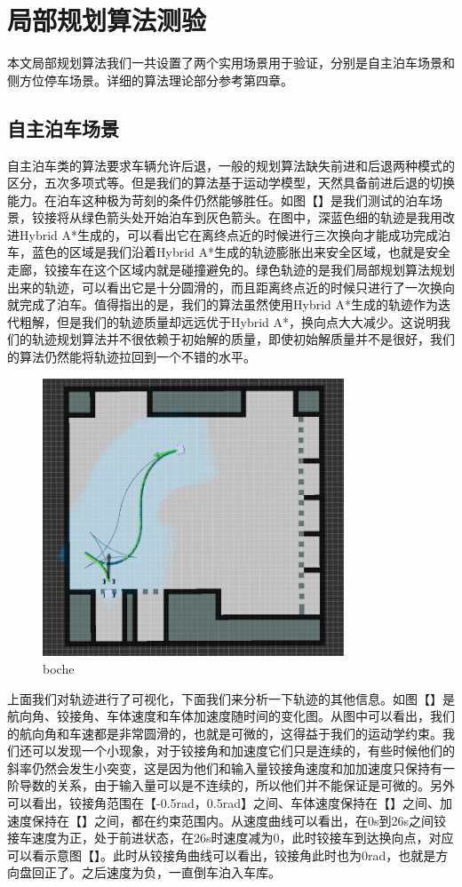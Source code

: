 \documentclass[master,academic]{ysuthesis} %
\begin{document}
	\section{局部规划算法测验}
	本文局部规划算法我们一共设置了两个实用场景用于验证，分别是自主泊车场景和侧方位停车场景。详细的算法理论部分参考第四章。
		\subsection{自主泊车场景}
		自主泊车类的算法要求车辆允许后退，一般的规划算法缺失前进和后退两种模式的区分，五次多项式等。但是我们的算法基于运动学模型，天然具备前进后退的切换能力。在泊车这种极为苛刻的条件仍然能够胜任。如图【】是我们测试的泊车场景，铰接将从绿色箭头处开始泊车到灰色箭头。在图中，深蓝色细的轨迹是我用改进Hybrid A*生成的，可以看出它在离终点近的时候进行三次换向才能成功完成泊车，蓝色的区域是我们沿着Hybrid A*生成的轨迹膨胀出来安全区域，也就是安全走廊，铰接车在这个区域内就是碰撞避免的。绿色轨迹的是我们局部规划算法规划出来的轨迹，可以看出它是十分圆滑的，而且距离终点近的时候只进行了一次换向就完成了泊车。值得指出的是，我们的算法虽然使用Hybrid A*生成的轨迹作为迭代粗解，但是我们的轨迹质量却远远优于Hybrid A*，换向点大大减少。这说明我们的轨迹规划算法并不很依赖于初始解的质量，即使初始解质量并不是很好，我们的算法仍然能将轨迹拉回到一个不错的水平。
		\begin{figure}[!ht]
			\centering
			\includegraphics[width=0.8\textwidth]{boche.png}
			\caption{boche}
			\label{fig:boche}
		\end{figure}
		上面我们对轨迹进行了可视化，下面我们来分析一下轨迹的其他信息。如图【】是航向角、铰接角、车体速度和车体加速度随时间的变化图。从图中可以看出，我们的航向角和车速都是非常圆滑的，也就是可微的，这得益于我们的运动学约束。我们还可以发现一个小现象，对于铰接角和加速度它们只是连续的，有些时候他们的斜率仍然会发生小突变，这是因为他们和输入量铰接角速度和加加速度只保持有一阶导数的关系，由于输入量可以是不连续的，所以他们并不能保证是可微的。另外可以看出，铰接角范围在【-0.5rad，0.5rad】之间、车体速度保持在【】之间、加速度保持在【】之间，都在约束范围内。从速度曲线可以看出，在0s到26s之间铰接车速度为正，处于前进状态，在26s时速度减为0，此时铰接车到达换向点，对应可以看示意图【】。此时从铰接角曲线可以看出，铰接角此时也为0rad，也就是方向盘回正了。之后速度为负，一直倒车泊入车库。
\end{document}
